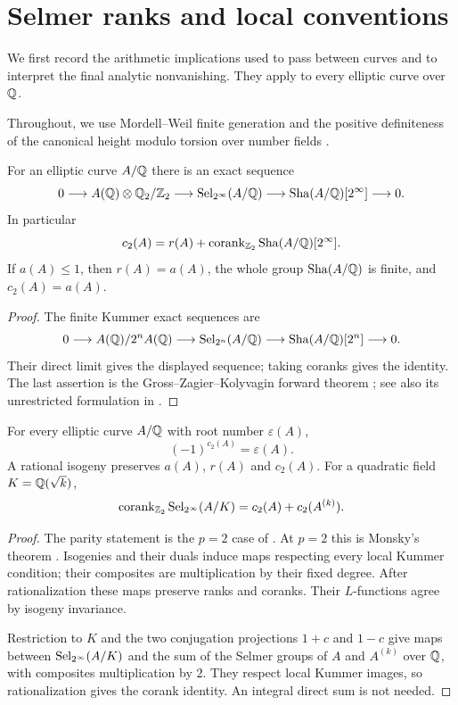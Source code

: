 \section{Selmer ranks and local conventions}\label{sec:preliminaries}

We first record the arithmetic implications used to pass between curves
and to interpret the final analytic nonvanishing. They apply to every
elliptic curve over $\mathbb Q$.

Throughout, we use Mordell--Weil finite generation and the positive
definiteness of the canonical height modulo torsion over number fields
\citep[Chapter~IV, finite-basis theorem, Theorem~4.7,
Remark~4.12, and Theorem~6.1]{MilneEC2021}.

\begin{lemma}\label{pr:ranks}
For an elliptic curve $A/\mathbb Q$ there is an exact sequence
\[
 0\longrightarrow A(\mathbb Q)\otimes\mathbb Q_2/\mathbb Z_2
 \longrightarrow\operatorname{Sel}_{2^\infty}(A/\mathbb Q)
 \longrightarrow\operatorname{Sha}(A/\mathbb Q)[2^\infty]\longrightarrow0.
\]
In particular
\[
 c_2(A)=r(A)+\operatorname{corank}_{\mathbb Z_2}\operatorname{Sha}(A/\mathbb Q)[2^\infty].
\]
If $a(A)\le1$, then $r(A)=a(A)$, the whole group $\operatorname{Sha}(A/\mathbb Q)$ is
finite, and $c_2(A)=a(A)$.
\end{lemma}

\begin{proof}
The finite Kummer exact sequences are
\[
 0\longrightarrow A(\mathbb Q)/2^nA(\mathbb Q)
 \longrightarrow\operatorname{Sel}_{2^n}(A/\mathbb Q)
 \longrightarrow\operatorname{Sha}(A/\mathbb Q)[2^n]\longrightarrow0.
\]
Their direct limit gives the displayed sequence; taking coranks gives
the identity. The last assertion is the Gross--Zagier--Kolyvagin
forward theorem \citep{GrossZagier1986,Kolyvagin1990}; see also its
unrestricted formulation in \citet[\S1]{Skinner2020}.
\end{proof}

\begin{lemma}\label{pr:invariance}
\label{prop:selmer-parity}
For every elliptic curve $A/\mathbb Q$ with root number $\varepsilon(A)$,
\[
 (-1)^{c_2(A)}=\varepsilon(A).
\]
A rational isogeny preserves $a(A)$, $r(A)$ and $c_2(A)$.
For a quadratic field $K=\mathbb Q(\sqrt{k})$,
\[
 \operatorname{corank}_{\mathbb Z_2}\operatorname{Sel}_{2^\infty}(A/K)
       =c_2(A)+c_2(A^{(k)}).
\]
\end{lemma}

\begin{proof}
The parity statement is the $p=2$ case of
\citet[Theorem~1.4, equivalently Theorem~4.19]{DokchitserDokchitser2010}.
At $p=2$ this is Monsky's theorem \citep{Monsky1996}.
Isogenies and their duals induce maps respecting every local Kummer
condition; their composites are multiplication by their fixed degree.
After rationalization these maps preserve ranks and coranks. Their
$L$-functions agree by isogeny invariance.

Restriction to $K$ and the two conjugation projections $1+c$ and $1-c$
give maps between $\operatorname{Sel}_{2^\infty}(A/K)$ and the sum of the Selmer
groups of $A$ and $A^{(k)}$ over $\mathbb Q$, with composites multiplication
by $2$. They respect local Kummer images, so rationalization gives the
corank identity. An integral direct sum is not needed.
\end{proof}

